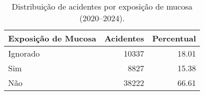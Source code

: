 \begin{table}
\caption{Distribuição de acidentes por exposição de mucosa (2020–2024).}
\begin{tabular}{lrr}
\toprule
Exposição de Mucosa & Acidentes & Percentual \\
\midrule
Ignorado & 10337 & 18.01 \\
Sim & 8827 & 15.38 \\
Não & 38222 & 66.61 \\
\bottomrule
\end{tabular}
\end{table}
